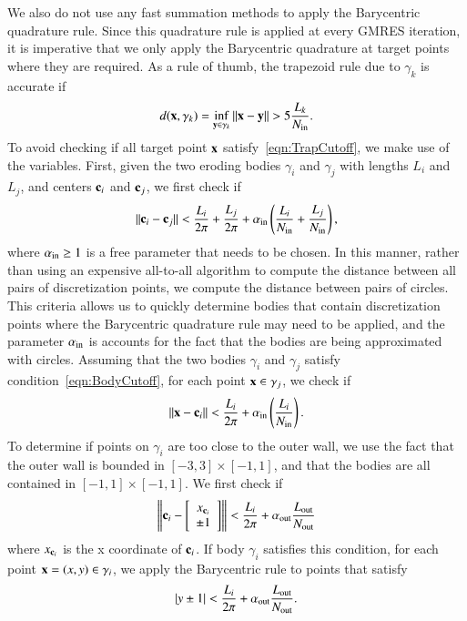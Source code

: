 \documentclass[preprint, 10pt]{elsarticle}
\begin{document}
We also do not use any fast summation methods to apply the Barycentric
quadrature rule.  Since this quadrature rule is applied at every GMRES
iteration, it is imperative that we only apply the Barycentric
quadrature at target points where they are required.  As a rule of
thumb, the trapezoid rule due to $\gamma_k$ is accurate if
\begin{align}
  \label{eqn:TrapCutoff}
  d({\mathbf{x}},\gamma_k) = \inf_{{\mathbf{y}} \in \gamma_k} \|{\mathbf{x}} - {\mathbf{y}}\| > 
    5 \frac{L_k}{N_{\mathrm{in}}}.
\end{align}
To avoid checking if all target point ${\mathbf{x}}$
satisfy~\eqref{eqn:TrapCutoff}, we make use of the {\thL} variables.
First, given the two eroding bodies $\gamma_i$ and $\gamma_j$ with
lengths $L_i$ and $L_j$, and centers ${\mathbf{c}}_i$ and ${\mathbf{c}}_j$, we first check
if
\begin{align}
  \label{eqn:BodyCutoff}
  \|{\mathbf{c}}_i - {\mathbf{c}}_j\| < \frac{L_i}{2\pi} + \frac{L_j}{2\pi} + 
    \alpha_{\mathrm{in}} \left(\frac{L_i}{N_{\mathrm{in}}} + \frac{L_j}{N_{\mathrm{in}}} \right),
\end{align}
where $\alpha_{\mathrm{in}} \geq 1$ is a free parameter that needs to be chosen.
In this manner, rather than using an expensive all-to-all algorithm to
compute the distance between all pairs of discretization points, we
compute the distance between pairs of circles.  This criteria allows us
to quickly determine bodies that contain discretization points where the
Barycentric quadrature rule may need to be applied, and the parameter
$\alpha_{\mathrm{in}}$ is accounts for the fact that the bodies are being
approximated with circles.  Assuming that the two bodies $\gamma_i$ and
$\gamma_j$ satisfy condition~\eqref{eqn:BodyCutoff}, for each point ${\mathbf{x}}
\in \gamma_j$, we check if
{\color{red}
\begin{align}
  \label{eqn:PointsBodyCutoff}
  \|{\mathbf{x}} - {\mathbf{c}}_i\| < \frac{L_i}{2\pi}
+ \alpha_{\mathrm{in}} \left(\frac{L_i}{N_{\mathrm{in}}} \right).
\end{align}
}
To determine if points on $\gamma_i$ are too close to the outer wall, we
use the fact that the outer wall is bounded in $[-3,3] \times [-1,1]$,
and that the bodies are all contained in $[-1,1] \times [-1,1]$.  We
first check if
\begin{align}
  \left\|{\mathbf{c}}_i - \left[
    \begin{array}{c}
      x_{{\mathbf{c}}_i } \\ \pm 1
    \end{array}
    \right]
  \right\| < \frac{L_i}{2 \pi} + \alpha_{\mathrm{out}} \frac{L_{\mathrm{out}}}{N_{\mathrm{out}}}
\end{align}
where $x_{{\mathbf{c}}_i } $ is the x coordinate of ${\mathbf{c}}_i$. If body $\gamma_i$
satisfies this condition, for each point ${\mathbf{x}}=(x,y) \in \gamma_i$, we
apply the Barycentric rule to points that satisfy
\begin{align}
  \label{eqn:PointsWallCutoff}
  |y \pm 1| < \frac{L_i}{2 \pi} +\alpha_{\mathrm{out}} \frac{L_{\mathrm{out}}}{N_{\mathrm{out}}}.
\end{align}
\end{document}
